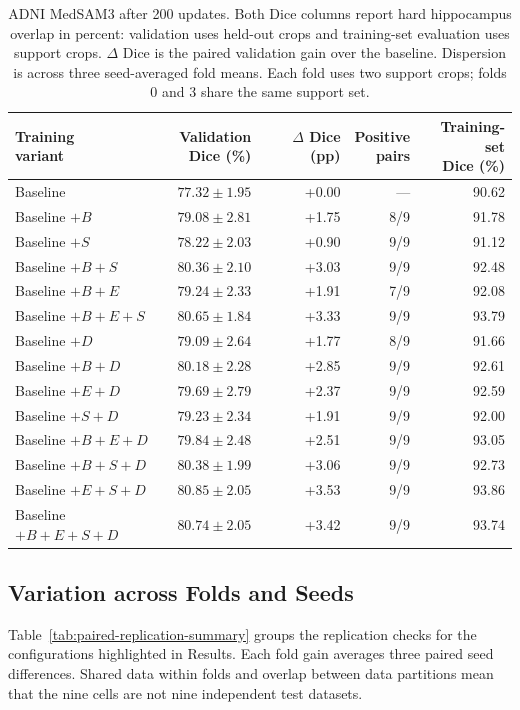 \documentclass[12pt,a4paper]{article}
\begin{document}
\begin{table}[htbp]
\centering\small{}
\setlength{\tabcolsep}{5pt}
\renewcommand{\arraystretch}{1.15}
\begin{tabular}{@{}lrrrr@{}}
\hline
\shortstack{Training\\variant} & \shortstack{Validation\\Dice (\%)} & \shortstack{$\Delta$ Dice\\(pp)} & \shortstack{Positive\\pairs} & \shortstack{Training-set\\Dice (\%)} \\
\hline
Baseline & $77.32\pm1.95$ & +0.00 & --- & 90.62 \\
Baseline $+B$ & $79.08\pm2.81$ & +1.75 & 8/9 & 91.78 \\
Baseline $+S$ & $78.22\pm2.03$ & +0.90 & 9/9 & 91.12 \\
Baseline $+B+S$ & $80.36\pm2.10$ & +3.03 & 9/9 & 92.48 \\
Baseline $+B+E$ & $79.24\pm2.33$ & +1.91 & 7/9 & 92.08 \\
Baseline $+B+E+S$ & $80.65\pm1.84$ & +3.33 & 9/9 & 93.79 \\
Baseline $+D$ & $79.09\pm2.64$ & +1.77 & 8/9 & 91.66 \\
Baseline $+B+D$ & $80.18\pm2.28$ & +2.85 & 9/9 & 92.61 \\
Baseline $+E+D$ & $79.69\pm2.79$ & +2.37 & 9/9 & 92.59 \\
Baseline $+S+D$ & $79.23\pm2.34$ & +1.91 & 9/9 & 92.00 \\
Baseline $+B+E+D$ & $79.84\pm2.48$ & +2.51 & 9/9 & 93.05 \\
Baseline $+B+S+D$ & $80.38\pm1.99$ & +3.06 & 9/9 & 92.73 \\
Baseline $+E+S+D$ & $80.85\pm2.05$ & +3.53 & 9/9 & 93.86 \\
Baseline $+B+E+S+D$ & $80.74\pm2.05$ & +3.42 & 9/9 & 93.74 \\
\hline
\end{tabular}
\caption{ADNI MedSAM3 after 200 updates. Both Dice columns report hard
hippocampus overlap in percent: validation uses held-out crops and
training-set evaluation uses support crops. $\Delta$ Dice is the paired
validation gain over the baseline. Dispersion is across three
seed-averaged fold means. Each fold uses two support crops; folds 0 and 3
share the same support set.}
\label{tab:medsam-adni-noaug}
\end{table}

\subsection{Variation across Folds and Seeds}
Table~\ref{tab:paired-replication-summary} groups the replication checks
for the configurations highlighted in Results. Each fold gain averages
three paired seed differences. Shared data within folds and overlap
between data partitions mean that the nine cells are not nine independent
test datasets.
\end{document}
